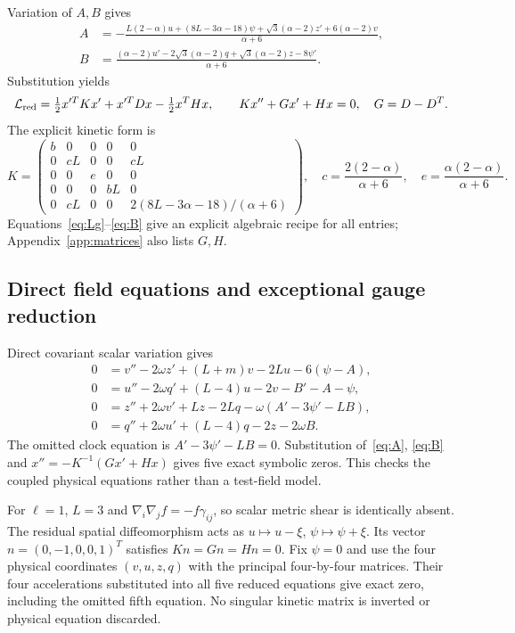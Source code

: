 \documentclass[11pt]{article}
\numberwithin{equation}{section}
\begin{document}
Variation of $A,B$ gives
\begin{align}
 A&=-\frac{L(2-\alpha)u+(8L-3\alpha-18)\psi+\sqrt3(\alpha-2)z'+6(\alpha-2)v}{\alpha+6},\label{eq:A}\\
 B&=\frac{(\alpha-2)u'-2\sqrt3(\alpha-2)q+\sqrt3(\alpha-2)z-8\psi'}{\alpha+6}.
 \label{eq:B}
\end{align}
Substitution yields
\begin{equation}
 \mathcal L_{\rm red}=\tfrac12x'^TKx'+x'^TDx-\tfrac12x^THx,
 \qquad Kx''+Gx'+Hx=0,\quad G=D-D^T.
 \label{eq:reduced}
\end{equation}
The explicit kinetic form is
\begin{equation}
 K=\begin{pmatrix}
 b&0&0&0&0\\0&cL&0&0&cL\\0&0&e&0&0\\0&0&0&bL&0\\
 0&cL&0&0&2(8L-3\alpha-18)/(\alpha+6)
 \end{pmatrix},\quad
 c=\frac{2(2-\alpha)}{\alpha+6},\quad e=\frac{\alpha(2-\alpha)}{\alpha+6}.
 \label{eq:K}
\end{equation}
Equations~\eqref{eq:Lg}--\eqref{eq:B} give an explicit algebraic recipe for all entries; Appendix~\ref{app:matrices} also lists $G,H$.

\subsection{Direct field equations and exceptional gauge reduction}

Direct covariant scalar variation gives
\begin{align}
 0&=v''-2\omega z'+(L+m)v-2Lu-6(\psi-A),\label{eq:KGv}\\
 0&=u''-2\omega q'+(L-4)u-2v-B'-A-\psi,\label{eq:KGu}\\
 0&=z''+2\omega v'+Lz-2Lq-\omega(A'-3\psi'-LB),\label{eq:KGz}\\
 0&=q''+2\omega u'+(L-4)q-2z-2\omega B.\label{eq:KGq}
\end{align}
The omitted clock equation is $A'-3\psi'-LB=0$.
Substitution of~\eqref{eq:A}, \eqref{eq:B} and $x''=-K^{-1}(Gx'+Hx)$ gives five exact symbolic zeros.
This checks the coupled physical equations rather than a test-field model.

For $\ell=1$, $L=3$ and $\nabla_i\nabla_jf=-f\gamma_{ij}$, so scalar metric shear is identically absent.
The residual spatial diffeomorphism acts as $u\mapsto u-\xi$, $\psi\mapsto\psi+\xi$.
Its vector $n=(0,-1,0,0,1)^T$ satisfies $Kn=Gn=Hn=0$.
Fix $\psi=0$ and use the four physical coordinates $(v,u,z,q)$ with the principal four-by-four matrices.
Their four accelerations substituted into all five reduced equations give exact zero, including the omitted fifth equation.
No singular kinetic matrix is inverted or physical equation discarded.
\end{document}
